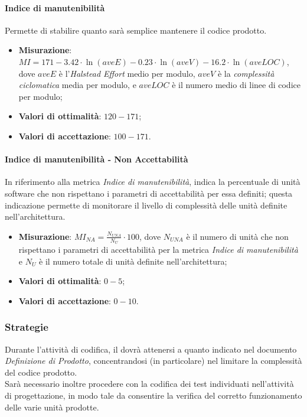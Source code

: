 \paragraph{Indice di manutenibilità}
\label{indMan}
Permette di stabilire quanto sarà semplice mantenere il codice prodotto.
\begin{itemize}
\item \textbf{Misurazione}: $MI = 171 - 3.42 \cdot \ln(aveE) - 0.23 \cdot \ln(aveV) - 16.2 \cdot \ln(aveLOC)$, dove $aveE$ è l'\textit{Halstead Effort} medio per modulo, $aveV$ è la \textit{complessità ciclomatica} media per modulo, e $aveLOC$ è il numero medio di linee di codice per modulo;
\item \textbf{Valori di ottimalità}: $120 - 171$;
\item \textbf{Valori di accettazione}: $100 - 171$.
\end{itemize}
\paragraph{Indice di manutenibilità - Non Accettabilità}
\label{indManNA}
In riferimento alla metrica \textit{Indice di manutenibilità}, indica la percentuale di unità software che non rispettano i parametri di accettabilità per essa definiti; questa indicazione permette di monitorare il livello di complessità delle unità definite nell'architettura.
\begin{itemize}
\item \textbf{Misurazione}: $MI_{NA}=\frac{N_{UNA}}{N_{U}} \cdot 100$, dove $N_{UNA}$ è il numero di unità che non rispettano i parametri di accettabilità per la metrica \textit{Indice di manutenibilità} e $N_{U}$ è il numero totale di unità definite nell'architettura;
\item \textbf{Valori di ottimalità}: $0 - 5$;
\item \textbf{Valori di accettazione}: $0 - 10$.
\end{itemize}
\subsubsection{Strategie}
Durante l'attività di codifica, il \Progr dovrà attenersi a quanto indicato nel documento \textit{Definizione di Prodotto}, concentrandosi (in particolare) nel limitare la complessità del codice prodotto.\\
Sarà necessario inoltre procedere con la codifica dei test individuati nell'attività di progettazione, in modo tale da consentire la verifica del corretto funzionamento delle varie unità prodotte.
